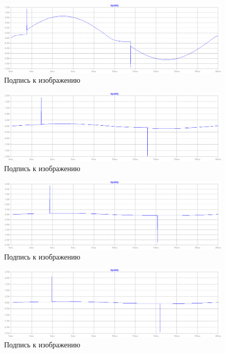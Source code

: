 \documentclass[a4paper, 12pt]{article}
\begin{document}
    \begin{figure}[H]
        \centering
        \includegraphics[scale=0.45]{R2-10k_L20m.png}
        \captionsetup{skip=0pt}
        \caption{Подпись к изображению}
        \label{fig:R2-10k_L20m}
    \end{figure}
    \begin{figure}[H]
        \centering
        \includegraphics[scale=0.45]{R2-60k_L20m.png}
        \captionsetup{skip=0pt}
        \caption{Подпись к изображению}
        \label{fig:R2-60k_L20m}
    \end{figure}
    \begin{figure}[H]
        \centering
        \includegraphics[scale=0.45]{R2-100k_L20m.png}
        \captionsetup{skip=0pt}
        \caption{Подпись к изображению}
        \label{fig:R2-100k_L20m}
    \end{figure}
    \begin{figure}[H]
        \centering
        \includegraphics[scale=0.45]{R2-110k_L20m.png}
        \captionsetup{skip=0pt}
        \caption{Подпись к изображению}
        \label{fig:R2-110k_L20m}
    \end{figure}
\end{document}
